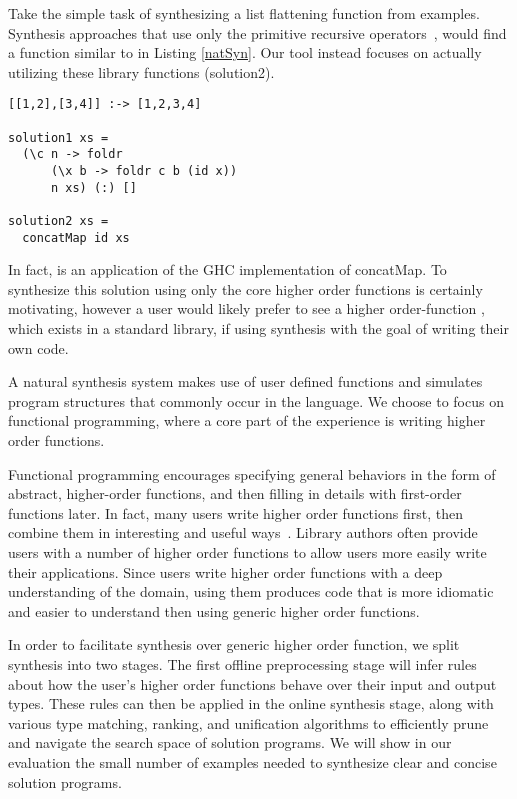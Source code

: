 Take the simple task of synthesizing a list flattening function from examples. 
Synthesis approaches that use only the primitive recursive operators~\cite{Osera:2015,FeserCD15}, would find a function similar to  in Listing \ref{natSyn}.
Our tool instead focuses on actually utilizing these library functions (solution2).

\begin{lstlisting}[caption=Low-level synthesis vs. Natural synthesis,label=natSyn]
[[1,2],[3,4]] :-> [1,2,3,4]

solution1 xs = 
  (\c n -> foldr 
      (\x b -> foldr c b (id x))
      n xs) (:) []
      
solution2 xs =
  concatMap id xs
\end{lstlisting}

\noindent In fact,  is an application of the GHC\cite{ghc} implementation of concatMap. To synthesize this solution using only the core higher order functions is certainly motivating, however a user would likely prefer to see a higher order-function , which exists in a standard library, if using synthesis with the goal of writing their own code.

A natural synthesis system makes use of user defined functions and simulates program structures that commonly occur in the language.  
We choose to focus on functional programming, where a core part of the experience is writing higher order functions.  

Functional programming encourages specifying general behaviors in the form of abstract, higher-order functions, and then filling in details with first-order functions later.
In fact, many users write higher order functions first, then combine them in interesting and useful ways~\cite{Lipovaca:2011}.
Library authors often provide users with a number of higher order functions to allow users more easily write their applications.
Since users write higher order functions with a deep understanding of the domain, using them produces code that is more idiomatic and easier to understand then using generic higher order functions.

In order to facilitate synthesis over generic higher order function, we split synthesis into two stages. 
The first offline preprocessing stage will infer rules about how the user's higher order functions behave over their input and output types.
These rules can then be applied in the online synthesis stage, along with various type matching, ranking, and unification algorithms to efficiently prune and navigate the search space of solution programs.
We will show in our evaluation the small number of examples needed to synthesize clear and concise solution programs.

